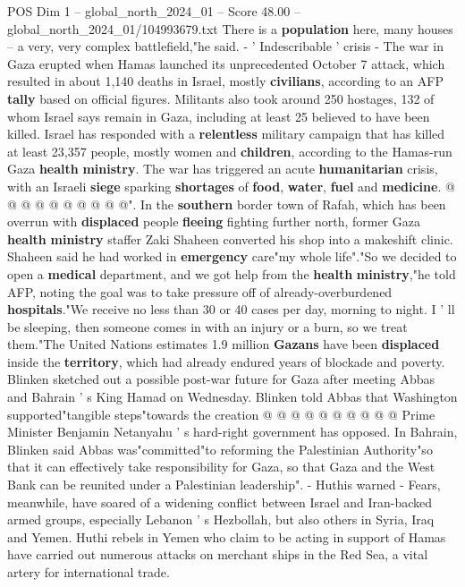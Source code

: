 \begin{textsample}{POS Dim 1 – global\_north\_2024\_01 – Score 48.00 – global\_north\_2024\_01/104993679.txt}
There is a \textbf{population} here, many houses -- a very, very complex battlefield,"he said. - ' Indescribable ' crisis - The war in Gaza erupted when Hamas launched its unprecedented October 7 attack, which resulted in about 1,140 deaths in Israel, mostly \textbf{civilians}, according to an AFP \textbf{tally} based on official figures.
Militants also took around 250 hostages, 132 of whom Israel says remain in Gaza, including at least 25 believed to have been killed.
Israel has responded with a \textbf{relentless} military campaign that has killed at least 23,357 people, mostly women and \textbf{children}, according to the Hamas-run Gaza \textbf{health} \textbf{ministry}.
The war has triggered an acute \textbf{humanitarian} crisis, with an Israeli \textbf{siege} sparking \textbf{shortages} of \textbf{food}, \textbf{water}, \textbf{fuel} and \textbf{medicine}. @ @ @ @ @ @ @ @ @ @".
In the \textbf{southern} border town of Rafah, which has been overrun with \textbf{displaced} people \textbf{fleeing} fighting further north, former Gaza \textbf{health} \textbf{ministry} staffer Zaki Shaheen converted his shop into a makeshift clinic.
Shaheen said he had worked in \textbf{emergency} care"my whole life"."So we decided to open a \textbf{medical} department, and we got help from the \textbf{health} \textbf{ministry},"he told AFP, noting the goal was to take pressure off of already-overburdened \textbf{hospitals}."We receive no less than 30 or 40 cases per day, morning to night.
I ' ll be sleeping, then someone comes in with an injury or a burn, so we treat them."The United Nations estimates 1.9 million \textbf{Gazans} have been \textbf{displaced} inside the \textbf{territory}, which had already endured years of blockade and poverty.
Blinken sketched out a possible post-war future for Gaza after meeting Abbas and Bahrain ' s King Hamad on Wednesday.
Blinken told Abbas that Washington supported"tangible steps"towards the creation @ @ @ @ @ @ @ @ @ @ Prime Minister Benjamin Netanyahu ' s hard-right government has opposed.
In Bahrain, Blinken said Abbas was"committed"to reforming the Palestinian Authority"so that it can effectively take responsibility for Gaza, so that Gaza and the West Bank can be reunited under a Palestinian leadership". - Huthis warned - Fears, meanwhile, have soared of a widening conflict between Israel and Iran-backed armed groups, especially Lebanon ' s Hezbollah, but also others in Syria, Iraq and Yemen.
Huthi rebels in Yemen who claim to be acting in support of Hamas have carried out numerous attacks on merchant ships in the Red Sea, a vital artery for international trade.

\end{textsample}
